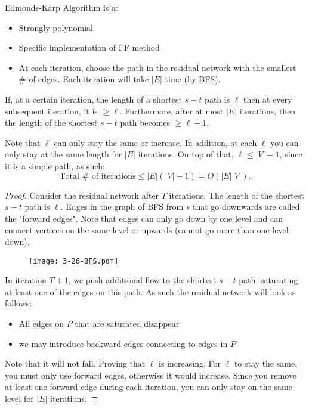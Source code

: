\documentclass[../main/main.tex]{subfiles}
\begin{document}
Edmonds-Karp Algorithm is a:
\begin{itemize}
	\item Strongly polynomial
	\item Specific implementation of FF method
	\item At each iteration, choose the path in the residual network with the smallest $\#$ of edges. Each iteration will take $|E|$ time (by BFS).
\end{itemize}

\begin{theorem}
	If, at a certain iteration, the length of a shortest $s-t$ path is $\ell$ then at every subsequent iteration, it is $\ge \ell$. Furthermore, after at most $|E|$ iterations, then the length of the shortest $s-t$ path becomes $\ge \ell+1$.
\end{theorem}
	Note that $\ell$ can only stay the same or increase. In addition, at each $\ell$ you can only stay at the same length for $|E|$ iterations. On top of that, $\ell\le |V|-1$, since it is a simple path, as such: \[
		\text{Total }\#\text{ of iterations}\le |E|\left( |V|-1 \right) =O(|E|| V|)
	.\] 
\begin{proof}
	Consider the residual network after $T$ iterations. The length of the shortest $s-t$ path is $\ell$. Edges in the graph of BFS from $s$ that go downwards are called the "forward edges". Note that edges can only go down by one level and can connect vertices on the same level or upwards (cannot go more than one level down).\\
\begin{figure}[h!]
	\centering
	\texttt{[image: 3-26-BFS.pdf]}
	\caption{}
	\label{fig:}
\end{figure}
	In iteration $T+1$, we push additional flow to the shortest $s-t$ path, saturating at least one of the edges on this path. As such the residual network will look as follows:
	\begin{itemize}
		\item All edges on $P$ that are saturated disappear
		\item we may introduce backward edges connecting to edges in $P$
	\end{itemize}
	Note that it will not fall. Proving that $\ell$ is increasing. For $\ell$  to stay the same, you must only use forward edges, otherwise it would increase. Since you remove at least one forward edge during each iteration, you can only stay on the same level for $|E|$ iterations.
\end{proof}
\end{document}
